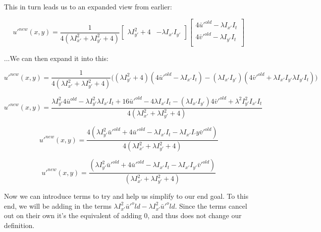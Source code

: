 \documentclass{article}
\begin{document}
\noindent This in turn leads us to an expanded view from earlier:

\begin{equation}
    u'^{new}(x,y) =
    \frac{1}{4(\lambda I_{x'}^2 + \lambda I_{y'}^2 + 4)}
    \begin{bmatrix}
        \lambda I_{y'}^2 + 4 & -\lambda I_{x'} I_{y'}
    \end{bmatrix}
    \begin{bmatrix}
        4\bar{u}'^{old}-\lambda I_{x'} I_t \\
        4\bar{v}'^{old}-\lambda I_{y'} I_t \\
    \end{bmatrix}
\end{equation}

\noindent ...We can then expand it into this:

\begin{equation}
    u'^{new}(x,y) = \frac{1}{4(\lambda I_{x'}^2 + \lambda I_{y'}^2 + 4)}
    \big(
    (\lambda I_{y'}^2 +4)(4\bar{u}'^{old}-\lambda I_{x'} I_t) - (\lambda I_{x'} I_{y'})(4\bar{v}'^{old}+\lambda I_{x'} I_{y'} \lambda I_{y'} I_t)
    )
\end{equation}

\begin{equation}
    u'^{new}(x,y) = \frac
    {\lambda I_{y'}^2 4\bar{u}^{old}-\lambda I_{y'}^2 \lambda I_{x'} I_t + 16\bar{u}'^{old}-4\lambda I_{x'} I_t-(\lambda I_{x'} I_{y'})4\bar{v}'^{old}+\lambda^2 I_{y'}^2 I_{x'} I_t}
    {4(\lambda I_{x'}^2 + \lambda I_{y'}^2 + 4)}
\end{equation}

\begin{equation}
    u'^{new}(x,y) = \frac
    {4(\lambda I_{y'}^2 \bar{u}'^{old} + 4\bar{u}'^{old} - \lambda I_{x'} I_t - \lambda I_{x'} I_{'}y \bar{v}'^{old})}
    {4(\lambda I_{x'}^2 + \lambda I_{y'}^2 + 4)}
\end{equation}

\begin{equation}
    u'^{new}(x,y) = \frac
    {(\lambda I_{y'}^2 \bar{u}'^{old} + 4\bar{u}'^{old} - \lambda I_{x'} I_t - \lambda I_{x'} I_{y'} \bar{v}'^{old})}
    {(\lambda I_{x'}^2 + \lambda I_{y'}^2 + 4)}
\end{equation}

\noindent Now we can introduce terms to try and help us simplify to our end goal. To this end, we will be adding in the terms $\lambda I_{x'}^2\bar{u}'^old-\lambda I_{x'}^2\bar{u}'^old$. Since the terms cancel out on their own it's the equivalent of adding 0, and thus does not change our definition.
\end{document}
